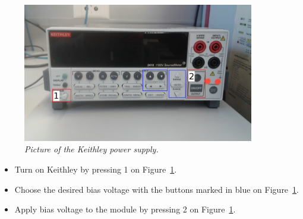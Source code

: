 \documentclass[a4paper,12pt,twoside]{article}
\begin{document}
\begin{figure} [h!] \centering 
\includegraphics[width=0.9\textwidth, angle=0] {./Figures/Keithley.jpg}
\caption{\em  \label{Keithley}
Picture of the Keithley power supply.}
\end{figure}
\begin{itemize}
\item Turn on Keithley by pressing 1 on Figure~\ref{Keithley}.
\item Choose the desired bias voltage with the buttons marked in blue on Figure~\ref{Keithley}.
\item Apply bias voltage to the module by pressing 2 on Figure~\ref{Keithley}.
\end{itemize}
\end{document}
